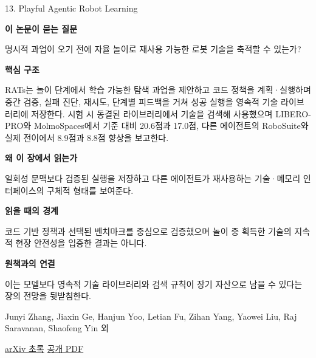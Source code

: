 \documentclass[11pt,openany]{book}
\begin{document}
\begin{termcard}{13. Playful Agentic Robot Learning}

\par

\medskip

{\sffamily\bfseries\color{deepblue} 이 논문이 묻는 질문}\par

명시적 과업이 오기 전에 자율 놀이로 재사용 가능한 로봇 기술을 축적할 수 있는가?

\smallskip

{\sffamily\bfseries\color{deepblue} 핵심 구조}\par

RATs는 놀이 단계에서 학습 가능한 탐색 과업을 제안하고 코드 정책을 계획·실행하며 중간 검증, 실패 진단, 재시도, 단계별 피드백을 거쳐 성공 실행을 영속적 기술 라이브러리에 저장한다. 시험 시 동결된 라이브러리에서 기술을 검색해 사용했으며 LIBERO-PRO와 MolmoSpaces에서 기준 대비 20.6점과 17.0점, 다른 에이전트의 RoboSuite와 실제 전이에서 8.9점과 8.8점 향상을 보고한다.

\smallskip

{\sffamily\bfseries\color{deepblue} 왜 이 장에서 읽는가}\par

일회성 문맥보다 검증된 실행을 저장하고 다른 에이전트가 재사용하는 기술·메모리 인터페이스의 구체적 형태를 보여준다.

\smallskip

{\sffamily\bfseries\color{coral} 읽을 때의 경계}\par

코드 기반 정책과 선택된 벤치마크를 중심으로 검증했으며 놀이 중 획득한 기술의 지속적 현장 안전성을 입증한 결과는 아니다.

\smallskip

{\sffamily\bfseries\color{teal} 원책과의 연결}\par

이는 모델보다 영속적 기술 라이브러리와 검색 규칙이 장기 자산으로 남을 수 있다는 장의 전망을 뒷받침한다.

\medskip

{\footnotesize\color{muted} Junyi Zhang, Jiaxin Ge, Hanjun Yoo, Letian Fu, Zihan Yang, Yaowei Liu, Raj Saravanan, Shaofeng Yin 외\par

\href{https://arxiv.org/abs/2606.19419}{arXiv 초록} \quad \href{https://arxiv.org/pdf/2606.19419}{공개 PDF}\par}

\end{termcard}
\end{document}
